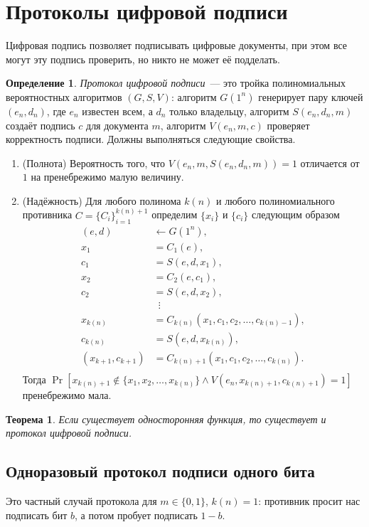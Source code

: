 \documentclass[12pt,a4paper]{article}
\newcommand{\bits}{\{0,1\}}
\newcommand{\seqn}[2]{{#1}_1,{#1}_2,\dotsc,{#1}_{#2}}
\theoremstyle{definition}
\newtheorem{definition}{Определение}[section]
\theoremstyle{plain}
\newtheorem{theorem}{Теорема}[section]
\theoremstyle{remark}
\begin{document}
\section{Протоколы цифровой подписи}
Цифровая подпись позволяет подписывать цифровые документы, при этом все могут эту подпись проверить,
но никто не может её подделать.

\begin{definition}
\emph{Протокол цифровой подписи}~--- это тройка полиномиальных
вероятностных алгоритмов $(G, S, V)$: алгоритм $G(1^n)$ генерирует пару ключей $(e_n, d_n)$, где $e_n$ известен всем, а $d_n$ только владельцу, алгоритм $S(e_n, d_n, m)$ создаёт 
подпись $c$ для документа $m$, алгоритм $V(e_n, m, c)$ проверяет
корректность подписи. Должны выполняться следующие свойства.
\begin{enumerate}
\item (Полнота) Вероятность того, что $V(e_n, m, S(e_n, d_n, m)) = 1$ отличается от $1$ на пренебрежимо малую величину.

\item (Надёжность) Для любого полинома $k(n)$ и любого полиномиального противника $C = \{C_i\}_{i=1}^{k(n)+1}$ 
определим $\{x_i\}$ и $\{c_i\}$ следующим образом
$$
 \begin{aligned}
 (e,d)&\gets G(1^n),\\
 x_1 &= C_1(e),\\
 c_1 &= S(e, d, x_1),\\ 
 x_2 &= C_2(e,c_1),\\
 c_2 &= S(e, d, x_2),\\  
 &\ \;\vdots\\ 
 x_{k(n)} &= C_{k(n)}(x_1, \seqn{c}{k(n) - 1}),\\
 c_{k(n)} &= S(e, d, x_{k(n)}),\\
 (x_{k+1}, c_{k+1}) &= C_{k(n)+1}(x_1, \seqn{c}{k(n)}).\\
 \end{aligned}
$$
Тогда 
$\Pr[x_{k(n)+1}\notin \{\seqn{x}{k(n)}\} \land 
V(e_n, x_{k(n)+1}, c_{k(n)+1}) = 1]$ пренебрежимо мала.
\end{enumerate}
\end{definition}
\begin{theorem}
Если существует односторонняя функция, то существует и протокол
цифровой подписи.
\end{theorem}
		
\subsection{Одноразовый протокол подписи одного бита}
Это частный случай протокола для $m\in\bits$, $k(n)=1$:
противник просит нас подписать бит $b$, а потом пробует
подписать $1-b$.
\end{document}

